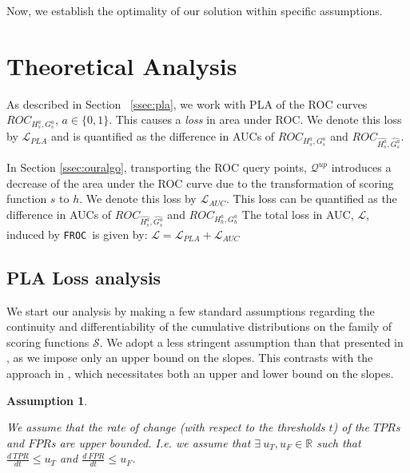 \documentclass{article}
\newtheorem{assumption}{Assumption}[section]
\newcommand{\ouralgo}{\texttt{FROC}}
\begin{document}
Now, we establish the optimality of our solution within specific assumptions.
\section{Theoretical Analysis}
As described in Section ~\eqref{ssec:pla}, we work with PLA of the ROC curves $ROC_{H_s^a, G_s^a}$, $a\in \{0,1\}$. This causes a \emph{loss} in area under ROC. We denote this loss by $\mathcal{L}_{PLA}$ and is quantified as the difference in AUCs of $ROC_{H_s^a, G_s^a}$ and $ROC_{\widehat{H_s^a}, \widehat{G_s^a}}$.


In Section \ref{ssec:ouralgo}, transporting the ROC query points, $\mathcal{Q}^{up}$ introduces a decrease of the area under the ROC curve due to the transformation of scoring function $s$ to $h$. We denote this loss by $\mathcal{L}_{AUC}$. 
This loss can be quantified as the difference in AUCs of $ROC_{\widehat{H_s^a}, \widehat{G_s^a}}$ and $ROC_{H_h^a, G_h^a}$
The total loss in AUC, $\mathcal{L}$, induced by \ouralgo\ is given by:
$\mathcal{L} = \mathcal{L}_{PLA} + \mathcal{L}_{AUC}$

\subsection{PLA Loss analysis} \label{ssec:lossplabound}

We start our analysis by making a few standard assumptions regarding the continuity and differentiability of the cumulative distributions on the family of scoring functions $\mathcal{S}$.
We adopt a less stringent assumption than that presented in \cite{vogel2021}, as we impose only an upper bound on the slopes. This contrasts with the approach in \cite{vogel2021}, which necessitates both an upper and lower bound on the slopes.
\begin{assumption} \label{assumption1}

We assume that the rate of change (with respect to the thresholds $t$) of the $TPR$s and $FPR$s are upper bounded. I.e. we assume that $\exists~ u_T , u_F \in \mathbb{R}$ such that $\frac{d~TPR}{dt}\le u_T$ and $\frac{d~FPR}{dt}\le u_F$. 
\end{assumption}
\end{document}
